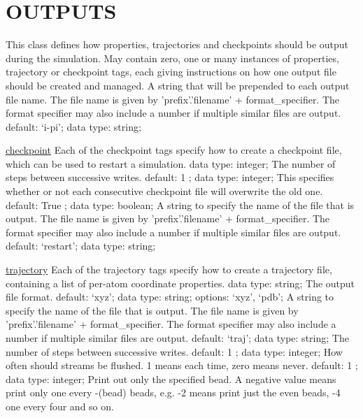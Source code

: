 \section{OUTPUTS}
\label{OUTPUTS}
\begin{ipifield}{}%
{This class defines how properties, trajectories and checkpoints should be output during the simulation. May contain zero, one or many instances of properties, trajectory or checkpoint tags, each giving instructions on how one output file should be created and managed.}%
{}%
{%
{A string that will be prepended to each output file name. The file name is given by 'prefix'.'filename' + format\_specifier. The format specifier may also include a number if multiple similar files are output.}%
{default: `i-pi'; data type: string; }%
}
\begin{ipifield}{\hyperref[CHECKPOINT]{checkpoint}}%
{Each of the checkpoint tags specify how to create a checkpoint file, which can be used to restart a simulation. }%
{data type: integer; }%
{%
{The number of steps between successive writes.}%
{default:  1 ; data type: integer; }%
%
{This specifies whether or not each consecutive checkpoint file will overwrite the old one.}%
{default:  True ; data type: boolean; }%
%
{A string to specify the name of the file that is output. The file name is given by 'prefix'.'filename' + format\_specifier. The format specifier may also include a number if multiple similar files are output.}%
{default: `restart'; data type: string; }%
}
\end{ipifield}
\begin{ipifield}{\hyperref[TRAJECTORY]{trajectory}}%
{Each of the trajectory tags specify how to create a trajectory file, containing a list of per-atom coordinate properties. }%
{data type: string; }%
{%
{The output file format.}%
{default: `xyz'; data type: string; options: `xyz', `pdb'; }%
%
{A string to specify the name of the file that is output. The file name is given by 'prefix'.'filename' + format\_specifier. The format specifier may also include a number if multiple similar files are output.}%
{default: `traj'; data type: string; }%
%
{The number of steps between successive writes.}%
{default:  1 ; data type: integer; }%
%
{How often should streams be flushed. 1 means each time, zero means never.}%
{default:  1 ; data type: integer; }%
%
{Print out only the specified bead. A negative value means print only one every -(bead) beads, e.g. -2 means print just the even beads, -4 one every four and so on.}%
}
\end{ipifield}
\end{ipifield}
